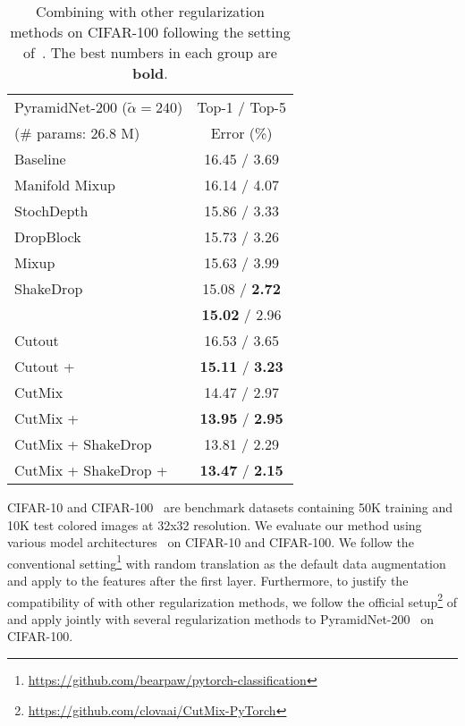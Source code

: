 \documentclass[final]{cvpr}
\begin{document}
\begin{table}[t]
    \centering
    \begin{tabular}{l|c}
\toprule
PyramidNet-200 ($\tilde{\alpha}=240$) &Top-1 / Top-5\\
(\# params: 26.8 M) & Error (\%)\\
\midrule
\midrule
    Baseline &16.45 / 3.69 \\
    Manifold Mixup~\cite{zhang2017mixup}&16.14 / 4.07 \\
    StochDepth~\cite{huang2016deep}& 15.86 / 3.33\\
    DropBlock~\cite{ghiasi2018dropblock}&15.73 / 3.26 \\
    Mixup~\cite{zhang2017mixup}&15.63 / 3.99 \\
    ShakeDrop~\cite{yamada2018shakedrop} & 15.08 /\textbf{ 2.72}\\
    \methodname{}&\textbf{15.02} / 2.96\\
\midrule
    Cutout~\cite{devries2017cutout}&16.53 / 3.65  \\
    Cutout + \methodname{}& \textbf{15.11} / \textbf{3.23} \\
    \midrule
    CutMix~\cite{yun2019cutmix}& 14.47 / 2.97\\
    CutMix + \methodname{}& \textbf{13.95} / \textbf{2.95} \\
    \midrule
    CutMix + ShakeDrop~\cite{yamada2018shakedrop} & 13.81 / 2.29\\
    CutMix + ShakeDrop + \methodname{}&    \textbf{13.47} / \textbf{2.15} \\
\bottomrule
\end{tabular}
\caption{Combining \methodname{} with other regularization methods on CIFAR-100 following the setting of~\cite{yun2019cutmix}. The best numbers in each group are \textbf{bold}.}
\label{tab:moex_cifar100_result2}     \vspace{-0.2in}
\end{table}

\label{subsec:cifar}
CIFAR-10 and CIFAR-100~\cite{krizhevsky2009learning} are benchmark datasets containing 50K training and 10K test colored images at 32x32 resolution. We evaluate our method using various model architectures~\cite{He2015,huang2017densely,xie2017aggregated,zagoruyko2016wide,han2017deep} on CIFAR-10 and CIFAR-100. We follow the conventional setting\footnote{\href{https://github.com/bearpaw/pytorch-classification}{https://github.com/bearpaw/pytorch-classification}} with random translation as the default data augmentation and apply \methodname{} to the features after the first layer. 
Furthermore, to justify the compatibility of \methodname{} with other regularization methods, we follow the official setup\footnote{\href{https://github.com/clovaai/CutMix-PyTorch}{https://github.com/clovaai/CutMix-PyTorch}} of \citep{yun2019cutmix} and apply \methodname{} jointly with several regularization methods to PyramidNet-200~\cite{han2017deep} on CIFAR-100.
\end{document}
